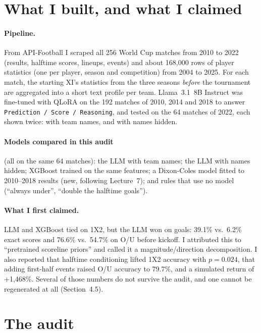 \documentclass[10pt,letterpaper]{article}
\begin{document}
\section{What I built, and what I claimed}

\paragraph{Pipeline.} From API-Football I scraped all 256 World Cup matches from 2010 to 2022
(results, halftime scores, lineups, events) and about 168{,}000 rows of player statistics
(one per player, season and competition) from 2004 to 2025. For each match, the starting XI's
statistics from the three seasons \emph{before} the tournament are aggregated into a short
text profile per team. Llama~3.1~8B Instruct was fine-tuned with QLoRA on the 192 matches of
2010, 2014 and 2018 to answer \texttt{Prediction / Score / Reasoning}, and tested on the 64
matches of 2022, each shown twice: with team names, and with names hidden.

\paragraph{Models compared in this audit} (all on the same 64 matches):
the LLM with team names; the LLM with names hidden; XGBoost trained on the same features;
a Dixon-Coles model fitted to 2010--2018 results (new, following Lecture~7); and rules that
use no model (``always under'', ``double the halftime goals'').

\paragraph{What I first claimed.} LLM and XGBoost tied on 1X2, but the LLM won on goals:
39.1\% vs.\ 6.2\% exact scores and 76.6\% vs.\ 54.7\% on O/U before kickoff. I attributed
this to ``pretrained scoreline priors'' and called it a magnitude/direction decomposition. I
also reported that halftime conditioning lifted 1X2 accuracy with $p=0.024$, that adding
first-half events raised O/U accuracy to 79.7\%, and a simulated return of +1{,}468\%.
Several of those numbers do not survive the audit, and one cannot be regenerated at all
(Section~4.5).

\section{The audit}
\end{document}
